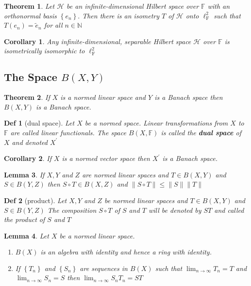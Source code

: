 \documentclass[10pt]{paper}
\newtheorem{theorem}{Theorem}[section]
\newtheorem{definition}{Def}[section]
\newtheorem{corollary}{Corollary}[section]
\newtheorem{lemma}[theorem]{Lemma}
\begin{document}
\begin{theorem}
    Let $\mathcal{H}$ be an infinite-dimensional Hilbert space over $\mathbb{F}$ with an orthonormal basis $\left\{e_{n}\right\} .$ Then there is an isometry $T$ of $\mathcal{H}$ onto $\ell_{\mathrm{F}}^{2}$ such that $T\left(e_{n}\right)=\widetilde{e}_{n}$ for all $n \in \mathbb{N}$
\end{theorem}

\begin{corollary}
    Any infinite-dimensional, separable Hilbert space $\mathcal{H}$ over $\mathbb{F}$ is isometrically isomorphic to $\ell_{\mathrm{F}}^{2}$
\end{corollary}

\subsection{The Space $B(X, Y)$}

\begin{theorem}
    If $X$ is a normed linear space and $Y$ is a Banach space then $B(X, Y)$ is a Banach space.
\end{theorem}

\begin{definition}[dual space]
    Let $X$ be a normed space. Linear transformations from $X$ to $\mathbb{F}$ are called linear functionals. The space $B(X, \mathbb{F})$ is called the \textbf{dual space} of $X$ and denoted $X^{\prime}$
\end{definition}

\begin{corollary}
    If $X$ is a normed vector space then $X^{\prime}$ is a Banach space.
\end{corollary}

\begin{lemma}
    If $X, Y$ and $Z$ are normed linear spaces and $T \in B(X, Y)$ and $S \in B(Y, Z)$ then $S \circ T \in B(X, Z)$ and $\|S \circ T\| \leq\|S\|\|T\|$
\end{lemma}

\begin{definition}[product]
    Let $X, Y$ and $Z$ be normed linear spaces and $T \in B(X, Y)$ and $S \in B(Y, Z)$ The composition $S \circ T$ of $S$ and $T$ will be denoted by $S T$ and called the product of $S$ and $T$
\end{definition}

\begin{lemma}
    Let $X$ be a normed linear space.
    \begin{enumerate}
        \item $B(X)$ is an algebra with identity and hence a ring with identity.
        \item If $\left\{T_{n}\right\}$ and $\left\{S_{n}\right\}$ are sequences in $B(X)$ such that $\lim _{n \rightarrow \infty} T_{n}=T$ and $\lim _{n \rightarrow \infty} S_{n}=S$ then $\lim _{n \rightarrow \infty} S_{n} T_{n}=S T$
    \end{enumerate}
\end{lemma}
\end{document}
